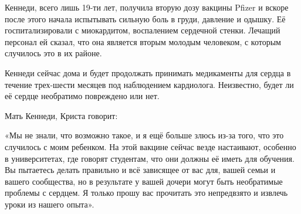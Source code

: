 

Кеннеди, всего лишь 19-ти лет, получила вторую дозу вакцины Pfizer и вскоре
после этого начала испытывать сильную боль в груди, давление и одышку. Её
госпитализировали с миокардитом, воспалением сердечной стенки. Лечащий персонал
ей сказал, что она является вторым молодым человеком, с которым случилось это в
их районе.

Кеннеди сейчас дома и будет продолжать принимать медикаменты для сердца в
течение трех-шести месяцев под наблюдением кардиолога. Неизвестно, будет ли её
сердце необратимо повреждено или нет.

Мать Кеннеди, Криста говорит:

«Мы не знали, что возможно такое, и я ещё больше злюсь из-за того, что это
случилось с моим ребенком. На этой вакцине сейчас везде настаивают, особенно в
университетах, где говорят студентам, что они должны её иметь для обучения. Вы
пытаетесь делать правильно и всё зависящее от вас для, вашей семьи и вашего
сообщества, но в результате у вашей дочери могут быть необратимые проблемы с
сердцем. Я только прошу вас прочитать это непредвзято и извлечь уроки из нашего
опыта».
